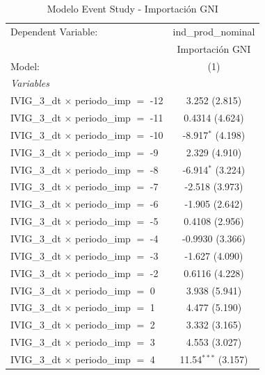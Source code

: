 \documentclass[12pt]{article}
\begin{document}
\begin{table}[htbp]
\centering
\begin{threeparttable}

   \caption{Modelo Event Study - Importación GNI}
   \centering
   \small
   \begin{tabular}{lc}
      \tabularnewline \midrule \midrule
      Dependent Variable:                           & ind\_prod\_nominal\\    
                                                    & Importación GNI \\   
      Model:                                        & (1)\\  
      \midrule
      \emph{Variables}\\
      IVIG\_3\_dt $\times$ periodo\_imp $=$ -12     & 3.252 (2.815)\\   
      IVIG\_3\_dt $\times$ periodo\_imp $=$ -11     & 0.4314 (4.624)\\   
      IVIG\_3\_dt $\times$ periodo\_imp $=$ -10     & -8.917$^{*}$ (4.198)\\   
      IVIG\_3\_dt $\times$ periodo\_imp $=$ -9      & 2.329 (4.910)\\   
      IVIG\_3\_dt $\times$ periodo\_imp $=$ -8      & -6.914$^{*}$ (3.224)\\   
      IVIG\_3\_dt $\times$ periodo\_imp $=$ -7      & -2.518 (3.973)\\   
      IVIG\_3\_dt $\times$ periodo\_imp $=$ -6      & -1.905 (2.642)\\   
      IVIG\_3\_dt $\times$ periodo\_imp $=$ -5      & 0.4108 (2.956)\\   
      IVIG\_3\_dt $\times$ periodo\_imp $=$ -4      & -0.9930 (3.366)\\   
      IVIG\_3\_dt $\times$ periodo\_imp $=$ -3      & -1.627 (4.090)\\   
      IVIG\_3\_dt $\times$ periodo\_imp $=$ -2      & 0.6116 (4.228)\\   
      IVIG\_3\_dt $\times$ periodo\_imp $=$ 0       & 3.938 (5.941)\\   
      IVIG\_3\_dt $\times$ periodo\_imp $=$ 1       & 4.477 (5.190)\\   
      IVIG\_3\_dt $\times$ periodo\_imp $=$ 2       & 3.332 (3.165)\\   
      IVIG\_3\_dt $\times$ periodo\_imp $=$ 3       & 4.553 (3.027)\\   
      IVIG\_3\_dt $\times$ periodo\_imp $=$ 4       & 11.54$^{***}$ (3.157)\\   

\end{tabular}
\end{threeparttable}
\end{table}
\end{document}
